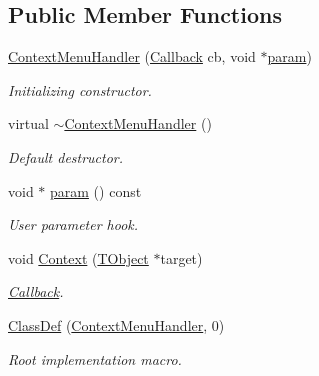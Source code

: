 \subsection*{Public Member Functions}
\begin{DoxyCompactItemize}
\item 
\hyperlink{class_d_d4hep_1_1_context_menu_handler_a55e7ee588a28189cb0766e1399d6b0c0}{Context\+Menu\+Handler} (\hyperlink{class_d_d4hep_1_1_callback}{Callback} cb, void $\ast$\hyperlink{class_d_d4hep_1_1_context_menu_handler_a1f806282dd9554fe94c5d296f95241c8}{param})
\begin{DoxyCompactList}\small\item\em Initializing constructor. \end{DoxyCompactList}\item 
virtual \hyperlink{class_d_d4hep_1_1_context_menu_handler_aa44899588abd2731d4e38a6a80bd8443}{$\sim$\+Context\+Menu\+Handler} ()
\begin{DoxyCompactList}\small\item\em Default destructor. \end{DoxyCompactList}\item 
void $\ast$ \hyperlink{class_d_d4hep_1_1_context_menu_handler_a1f806282dd9554fe94c5d296f95241c8}{param} () const
\begin{DoxyCompactList}\small\item\em User parameter hook. \end{DoxyCompactList}\item 
void \hyperlink{class_d_d4hep_1_1_context_menu_handler_a1e8043084d74ec968d010d6d7452f56b}{Context} (\hyperlink{class_t_object}{T\+Object} $\ast$target)
\begin{DoxyCompactList}\small\item\em \hyperlink{class_d_d4hep_1_1_callback}{Callback}. \end{DoxyCompactList}\item 
\hyperlink{class_d_d4hep_1_1_context_menu_handler_a1464908be325d3eef9a71cffa57d0968}{Class\+Def} (\hyperlink{class_d_d4hep_1_1_context_menu_handler}{Context\+Menu\+Handler}, 0)
\begin{DoxyCompactList}\small\item\em Root implementation macro. \end{DoxyCompactList}\end{DoxyCompactItemize}
